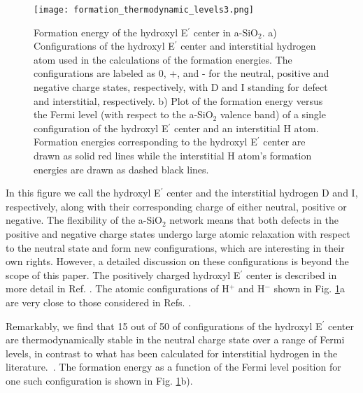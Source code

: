 \documentclass[aps,prb,reprint,superscriptaddress,showpacs]{revtex4-1}
\begin{document}
\begin{figure}[h!]
\texttt{[image: formation\_thermodynamic\_levels3.png]}
\caption{Formation energy of the hydroxyl E$^\prime$ center in a-SiO$_2$. a) Configurations of the hydroxyl E$^\prime$ center and interstitial hydrogen atom used in the calculations of the formation energies.  The configurations are labeled as 0, +, and - for the neutral, positive and negative charge states, respectively, with D and I standing for defect and interstitial, respectively. b) Plot of the formation energy versus the Fermi level (with respect to the a-SiO$_2$ valence band) of a single configuration of the hydroxyl E$^\prime$ center and an interstitial H atom. Formation energies corresponding to the hydroxyl E$^\prime$ center are drawn as solid red lines while the interstitial H atom's formation energies are drawn as dashed black lines.}
\label{fig:hydroxy_thermodynamic}
\end{figure}

In this figure we call the hydroxyl E$^\prime$ center and the interstitial hydrogen D and I, respectively, along with their corresponding charge of either neutral, positive or negative. The flexibility of the a-SiO$_2$ network means that both defects in the positive and negative charge states undergo large atomic relaxation with respect to the neutral state and form new configurations, which are interesting in their own rights. However, a detailed discussion on these configurations is beyond the scope of this paper. The positively charged hydroxyl E$^\prime$ center is described in more detail in Ref. \cite{h_charged_mee}. The atomic configurations of H$^+$ and H$^-$ shown in Fig. \ref{fig:hydroxy_thermodynamic}a are very close to those considered in Refs. \cite{godet_hydrogen,robertson_oxides}.

Remarkably, we find that 15 out of 50 of configurations of the hydroxyl E$^\prime$ center are thermodynamically stable in the neutral charge state over a range of Fermi levels, in contrast to what has been calculated for interstitial hydrogen in the literature.~\cite{godet_hydrogen,robertson_oxides}.  The formation energy as a function of the Fermi level position for one such configuration is shown in Fig. \ref{fig:hydroxy_thermodynamic}b). 
\end{document}
